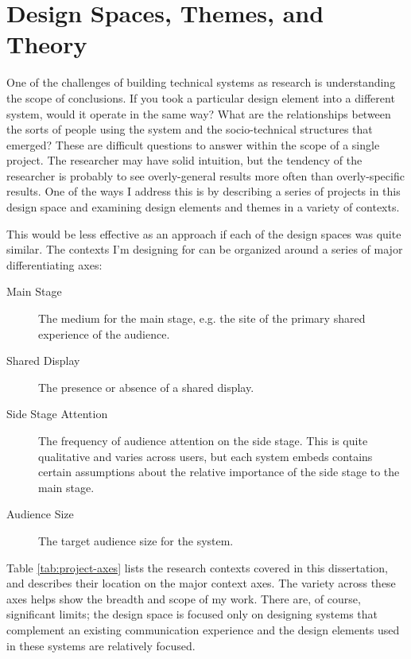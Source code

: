 

\section{Design Spaces, Themes, and Theory}

One of the challenges of building technical systems as research is understanding the scope of conclusions. If you took a particular design element into a different system, would it operate in the same way? What are the relationships between the sorts of people using the system and the socio-technical structures that emerged? These are difficult questions to answer within the scope of a single project. The researcher may have solid intuition, but the tendency of the researcher is probably to see overly-general results more often than overly-specific results. One of the ways I address this is by describing a series of projects in this design space and examining design elements and themes in a variety of contexts.

This would be less effective as an approach if each of the design spaces was quite similar. The contexts I'm designing for can be organized around a series of major differentiating axes:

\begin{description}
\item[Main Stage]{The medium for the main stage, e.g. the site of the primary shared experience of the audience.}
\item[Shared Display]{The presence or absence of a shared display.}
\item[Side Stage Attention]{The frequency of audience attention on the side stage. This is quite qualitative and varies across users, but each system embeds contains certain assumptions about the relative importance of the side stage to the main stage.}
\item[Audience Size]{The target audience size for the system.}
\end{description}

Table \ref{tab:project-axes} lists the research contexts covered in this dissertation, and describes their location on the major context axes. The variety across these axes helps show the breadth and scope of my work. There are, of course, significant limits; the design space is focused only on designing systems that complement an existing communication experience and the design elements used in these systems are relatively focused.

